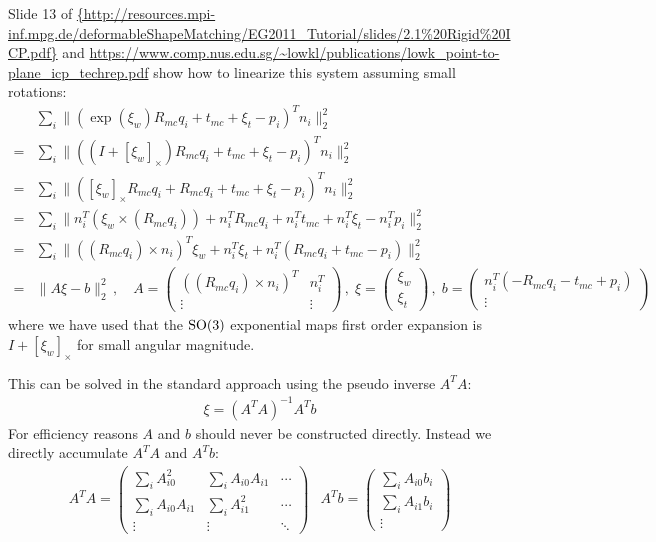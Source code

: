 Slide 13 of 
\url{{http://resources.mpi-inf.mpg.de/deformableShapeMatching/EG2011_Tutorial/slides/2.1%
\url{https://www.comp.nus.edu.sg/~lowkl/publications/lowk_point-to-plane_icp_techrep.pdf}
show how to linearize this system assuming small rotations:
\begin{align}
  &\sum_i \| (  \exp(\xi_w) R_{mc} q_i + t_{mc} + \xi_t - p_i )^T n_i \|^2_2 \\
  =& \sum_i \| ( (I + [\xi_w]_\times) R_{mc} q_i + t_{mc} + \xi_t - p_i )^T n_i \|^2_2\\
  =& \sum_i \| (  [\xi_w]_\times R_{mc} q_i + R_{mc} q_i + t_{mc} + \xi_t - p_i )^T n_i \|^2_2\\
  =& \sum_i \| n_i^T (\xi_w \times (R_{mc} q_i)) + n_i^T R_{mc} q_i + n_i^T t_{mc} + n_i^T \xi_t -n_i^T p_i \|^2_2\\
  =& \sum_i \|  ( (R_{mc} q_i) \times n_i)^T \xi_w + n_i^T \xi_t + n_i^T ( R_{mc} q_i + t_{mc} - p_i) \|^2_2\\
  =& \|  A \xi - b \|^2_2  \,,\quad
  A = \begin{pmatrix}
    ((R_{mc} q_i) \times n_i)^T &  n_i^T \\
    \vdots & \vdots
  \end{pmatrix}\,,\;
  \xi = \begin{pmatrix} \xi_w \\ \xi_t \end{pmatrix}\,,\;
  b = \begin{pmatrix}
    n_i^T ( - R_{mc} q_i - t_{mc} + p_i) \\
    \vdots
  \end{pmatrix}
\end{align}
where we have used that the $\mathrm{SO(3)}$ exponential maps first order
expansion is $I + [\xi_w]_\times$ for small angular magnitude.

This can be solved in the standard approach using the pseudo inverse $A^TA$:
\begin{align}
  \xi = (A^TA)^{-1} A^Tb
\end{align}
For efficiency reasons $A$ and $b$ should never be constructed
directly. Instead we directly accumulate $A^TA$ and $A^Tb$:
\begin{align}
  A^TA = \begin{pmatrix}
    \sum_i A_{i0}^2 & \sum_i A_{i0} A_{i1} & \cdots \\
    \sum_i A_{i0} A_{i1} & \sum_i A_{i1}^2 & \cdots \\
      \vdots & \vdots & \ddots 
  \end{pmatrix}
  & 
  A^Tb = \begin{pmatrix}
    \sum_i A_{i0} b_{i} \\
    \sum_i A_{i1} b_{i} \\
      \vdots 
  \end{pmatrix}
\end{align}

